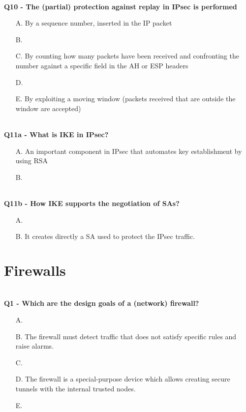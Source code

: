 \textbf{\\Q10 - The (partial) protection against replay in IPsec is performed}
\begin{itemize}
    \item[A.] By a sequence number, inserted in the IP packet
    \item[B.] 
    \item[C.] By counting how many packets have been received and confronting the number against a specific field in the AH or ESP headers
    \item[D.] 
    \item[E.] By exploiting a moving window (packets received that are outside the window are accepted)
\end{itemize}

\textbf{\\Q11a - What is IKE in IPsec?}
\begin{itemize}
    \item[A.] An important component in IPsec that automates key establishment by using RSA
    \item[B.] 
\end{itemize}
\textbf{\\Q11b - How IKE supports the negotiation of SAs?}
\begin{itemize}
    \item[A.] 
    \item[B.] It creates directly a SA used to protect the IPsec traffic.
\end{itemize}
\com{}

\section{Firewalls}

\textbf{\\Q1 - Which are the design goals of a (network) firewall?}
\begin{itemize}
    \item[A.] 
    \item[B.] The firewall must detect traffic that does not satisfy specific rules and raise alarms.
    \item[C.] 
    \item[D.] The firewall is a special-purpose device which allows creating secure tunnels with the internal trusted nodes.
    \item[E.] 
\end{itemize}

